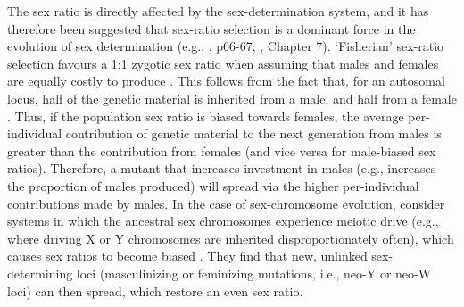 \documentclass[12pt]{article}
\begin{document}
The sex ratio is directly affected by the sex-determination system, and it has therefore been suggested that sex-ratio selection is a dominant force in the evolution of sex determination (e.g., \citealt{Bull:1983vi}, p66-67; \citealt{Beukeboom:2014vb}, Chapter 7). 
`Fisherian' sex-ratio selection favours a 1:1 zygotic sex ratio when assuming that males and females are equally costly to produce \citep{Fisher:1930wy,Charnov:1982wg}.
This follows from the fact that, for an autosomal locus, half of the genetic material is inherited from a male, and half from a female \citep{West:2009we}. 
Thus, if the population sex ratio is biased towards females, the average per-individual contribution of genetic material to the next generation from males is greater than the contribution from females (and vice versa for male-biased sex ratios). 
Therefore, a mutant that increases investment in males (e.g., increases the proportion of males produced) will spread via the higher per-individual contributions made by males. 
In the case of sex-chromosome evolution, \citet{Kozielska:2010vm} consider systems in which the ancestral sex chromosomes experience meiotic drive (e.g., where driving X or Y chromosomes are inherited disproportionately often), which causes sex ratios to become biased \citep{Hamilton:1967ts}. 
They find that new, unlinked sex-determining loci (masculinizing or feminizing mutations, i.e., neo-Y or neo-W loci) can then spread, which restore an even sex ratio. 
\end{document}
